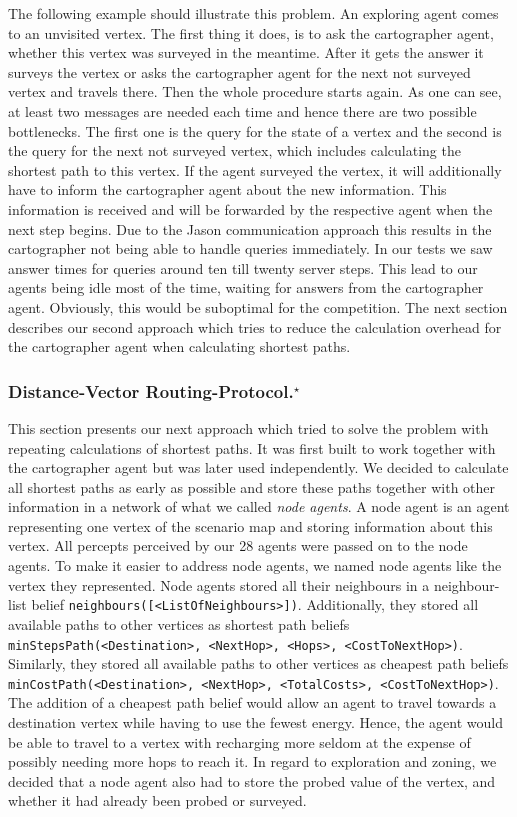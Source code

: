 The following example should illustrate this problem.
An exploring agent comes to an unvisited vertex.
The first thing it does, is to ask the cartographer agent, whether this vertex was surveyed in the meantime.
After it gets the answer it surveys the vertex or asks the cartographer agent for the next not surveyed vertex and travels there.
Then the whole procedure starts again.
As one can see, at least two messages are needed each time and hence there are two possible bottlenecks.
The first one is the query for the state of a vertex and the second is the query for the next not surveyed vertex, which includes calculating the shortest path to this vertex.
If the agent surveyed the vertex, it will additionally have to inform the cartographer agent about the new information.
This information is received and will be forwarded by the respective agent when the next step begins.
Due to the Jason communication approach this results in the cartographer not being able to handle queries immediately.
In our tests we saw answer times for queries around ten till twenty server steps.
This lead to our agents being idle most of the time, waiting for answers from the cartographer agent.
Obviously, this would be suboptimal for the competition.
The next section describes our second approach which tries to reduce the calculation overhead for the cartographer agent when calculating shortest paths.

\subsubsection[Distance-Vector Routing Protocol]{Distance-Vector Routing-Protocol.$^\star$}\label{alg:map_dv}
This section presents our next approach which tried to solve the problem with repeating calculations of shortest paths.
It was first built to work together with the cartographer agent but was later used independently.
We decided to calculate all shortest paths as early as possible and store these paths together with other information in a network of what we called \emph{node agents}.
A node agent is an agent representing one vertex of the scenario map and storing information about this vertex.
All percepts perceived by our 28 agents were passed on to the node agents.
To make it easier to address node agents, we named node agents like the vertex they represented.
Node agents stored all their neighbours in a neighbour-list belief \texttt{neighbours([<ListOfNeighbours>])}.
Additionally, they stored all available paths to other vertices as shortest path beliefs \texttt{minStepsPath(<Destination>, <NextHop>, <Hops>, <CostToNextHop>)}.
Similarly, they stored all available paths to other vertices as cheapest path beliefs \texttt{minCostPath(<Destination>, <NextHop>, <TotalCosts>, <CostToNextHop>)}.
The addition of a cheapest path belief would allow an agent to travel towards a destination vertex while having to use the fewest energy.
Hence, the agent would be able to travel to a vertex with recharging more seldom at the expense of possibly needing more hops to reach it.
In regard to exploration and zoning, we decided that a node agent also had to store the probed value of the vertex, and whether it had already been probed or surveyed.

